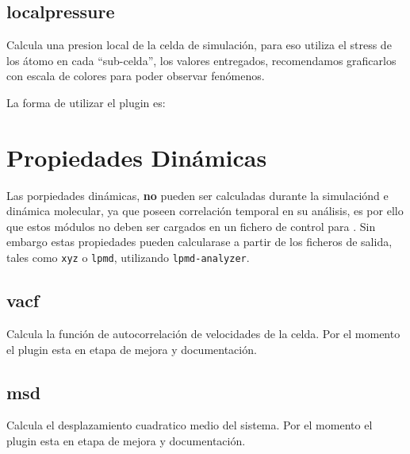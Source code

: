 \subsection{localpressure}

Calcula una presion local de la celda de simulaci\'on, para eso utiliza el stress de los \'atomo en cada ``sub-celda'', los valores entregados, recomendamos graficarlos con escala de colores para poder observar fen\'omenos. 

La forma de utilizar el plugin es:


\section{Propiedades Din\'amicas}
Las porpiedades din\'amicas, \textbf{no} pueden ser calculadas durante la simulaci\'ond e din\'amica molecular, ya que poseen correlaci\'on temporal en su an\'alisis, es por ello que estos m\'odulos no deben ser cargados en un fichero de control para {\lpmd}. Sin embargo estas propiedades pueden calcularase a partir de los ficheros de salida, tales como \verb|xyz| o \verb|lpmd|, utilizando \verb|lpmd-analyzer|.
\subsection{vacf}
Calcula la funci\'on de autocorrelaci\'on de velocidades de la celda. Por el momento el plugin esta en etapa de mejora y documentaci\'on.
\subsection{msd}
Calcula el desplazamiento cuadratico medio del sistema. Por el momento el plugin esta en etapa de mejora y documentaci\'on.
